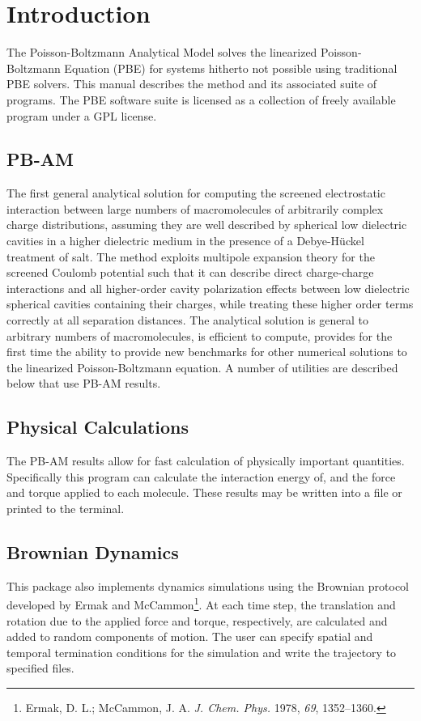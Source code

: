 
\chapter{Introduction}



The Poisson-Boltzmann Analytical Model solves the linearized Poisson-Boltzmann Equation (PBE) for systems hitherto not possible using traditional PBE solvers. This manual describes the method and its associated suite of programs. The PBE software suite is licensed as a collection of freely available program under a GPL license. 


\section{PB-AM} The first general analytical solution for computing the screened electrostatic interaction between large numbers of macromolecules of arbitrarily complex charge distributions, assuming they are well described by spherical low dielectric cavities in a higher dielectric medium in the presence of a Debye-H{\"u}ckel treatment of salt. The method exploits multipole expansion theory for the screened Coulomb potential such that it can describe direct charge-charge interactions and all higher-order cavity polarization effects between low dielectric spherical cavities containing their charges, while treating these higher order terms correctly at all separation distances. The analytical solution is general to arbitrary numbers of macromolecules, is efficient to compute, provides for the first time the ability to provide new benchmarks for other numerical solutions to the linearized Poisson-Boltzmann equation. A number of utilities are described below that use PB-AM results.

\section{Physical Calculations} The PB-AM results allow for fast calculation of physically important quantities. Specifically this program can calculate the interaction energy of, and the force and torque applied to each molecule. These results may be written into a file or printed to the terminal.

\section{Brownian Dynamics} This package also implements dynamics simulations using the Brownian protocol developed by Ermak and McCammon\footnote{Ermak, D. L.; McCammon, J. A. \textit{J. Chem. Phys.} 1978, \textit{69}, 1352\---1360.}. At each time step, the translation and rotation due to the applied force and torque, respectively, are calculated and added to random components of motion. The user can specify spatial and temporal termination conditions for the simulation and write the trajectory to specified files.

